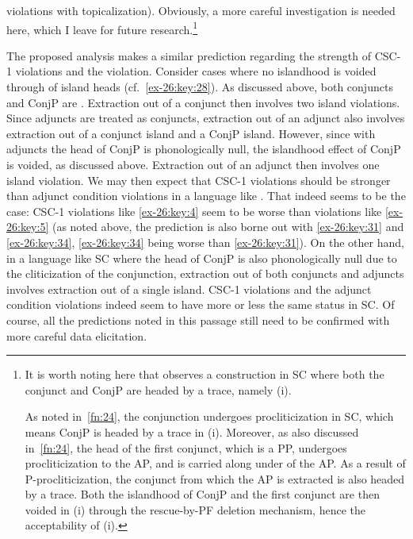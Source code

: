 \documentclass[output=paper]{langsci/langscibook}
\begin{document}
violations with  topicalization). Obviously, a more careful
investigation is needed here, which I leave for future research.\footnote{It
    is worth noting here that \textcite{Odainpress} observes a construction in
    \gls{SC} where both the conjunct and ConjP are headed by a trace, namely
    (i).

\z

As noted in~\cref{fn:24}, the conjunction undergoes procliticization in
\gls{SC}, which means ConjP is headed by a trace in (i). Moreover, as also
discussed in~\cref{fn:24}, the head of the first conjunct, which is a PP,
undergoes procliticization to the AP, and is carried along under  of
the AP. As a result of P-procliticization, the conjunct from which the AP is
extracted is also headed by a trace. Both the islandhood of ConjP and the first
conjunct are then voided in (i) through the rescue-by-\gls{PF} deletion mechanism,
hence the acceptability of (i).}

The proposed analysis makes a similar prediction regarding the strength of
CSC-1 violations and the  violation. Consider cases where no
islandhood is voided through  of island heads (cf.\ \eqref{ex-26:key:28}). As discussed
above, both conjuncts and ConjP are . Extraction out of a conjunct then
involves two island violations. Since adjuncts are treated as conjuncts,
extraction out of an adjunct also involves extraction out of a conjunct island
and a ConjP island. However, since with adjuncts the head of ConjP is
phonologically null, the islandhood effect of ConjP is voided, as discussed
above. Extraction out of an adjunct then involves one island violation. We may
then expect that CSC-1 violations should be stronger than adjunct condition
violations in a language like . That indeed seems to be the case: CSC-1
violations like \eqref{ex-26:key:4} seem to be worse than  violations like
\eqref{ex-26:key:5} (as noted above, the prediction is also borne out with  \eqref{ex-26:key:31} and \eqref{ex-26:key:34},
\eqref{ex-26:key:34} being worse than \eqref{ex-26:key:31}). On the other hand, in a language like \gls{SC}
where the head of ConjP is also phonologically null due to the cliticization of
the conjunction, extraction out of both conjuncts and adjuncts involves
extraction out of a single island. CSC-1 violations and the adjunct condition
violations indeed seem to have more or less the same status in \gls{SC}. Of course,
all the predictions noted in this passage still need to be confirmed with more
careful data elicitation.
\end{document}
